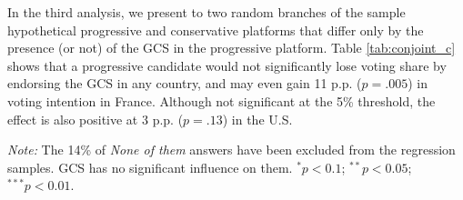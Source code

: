 In the third analysis, we present to two random branches of the sample hypothetical progressive and conservative platforms that differ only by the presence (or not) of the GCS in the progressive platform. Table \ref{tab:conjoint_c} shows that a progressive candidate would not significantly lose voting share by endorsing the GCS in any country, and may even gain 11 p.p. ($p = .005$) in voting intention in France. Although not significant at the 5\% threshold, the effect is also positive at 3 p.p. ($p = .13$) in the U.S. %


\begin{table}[h]
  \caption[Influence of the GCS on electoral prospects]{Preference for a progressive platform depending on whether it includes the GCS or not. (Question \ref{q:conjoint_c}) 
  } %
  \makebox[\textwidth][c]{}\label{tab:conjoint_c}
  {\footnotesize \textit{Note:} The 14\% of \textit{None of them} answers have been excluded from the regression samples. GCS has no significant influence on them. $^{*}p<0.1$; $^{**} p<0.05$; $^{***} p<0.01$. 
  }
\end{table}

